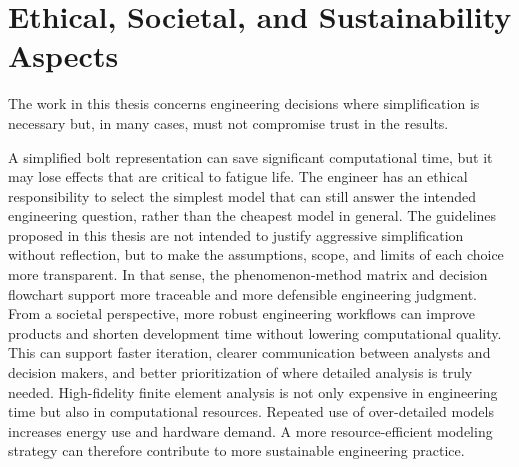 \documentclass[a4paper,twoside]{bth}
\begin{document}
\newpage
\section{Ethical, Societal, and Sustainability Aspects}
The work in this thesis concerns engineering decisions where simplification is necessary but, in many cases, must not compromise trust in the results. 

A simplified bolt representation can save significant computational time, but it may lose effects that are critical to fatigue life. The engineer has an ethical responsibility to select the simplest model that can still answer the intended engineering question, rather than the cheapest model in general. The guidelines proposed in this thesis are not intended to justify aggressive simplification without reflection, but to make the assumptions, scope, and limits of each choice more transparent. In that sense, the phenomenon-method matrix and decision flowchart support more traceable and more defensible engineering judgment. From a societal perspective, more robust engineering workflows can improve products and shorten development time without lowering computational quality. This can support faster iteration, clearer communication between analysts and decision makers, and better prioritization of where detailed analysis is truly needed. High-fidelity finite element analysis is not only expensive in engineering time but also in computational resources. Repeated use of over-detailed models increases energy use and hardware demand. A more resource-efficient modeling strategy can therefore contribute to more sustainable engineering practice.
\end{document}
